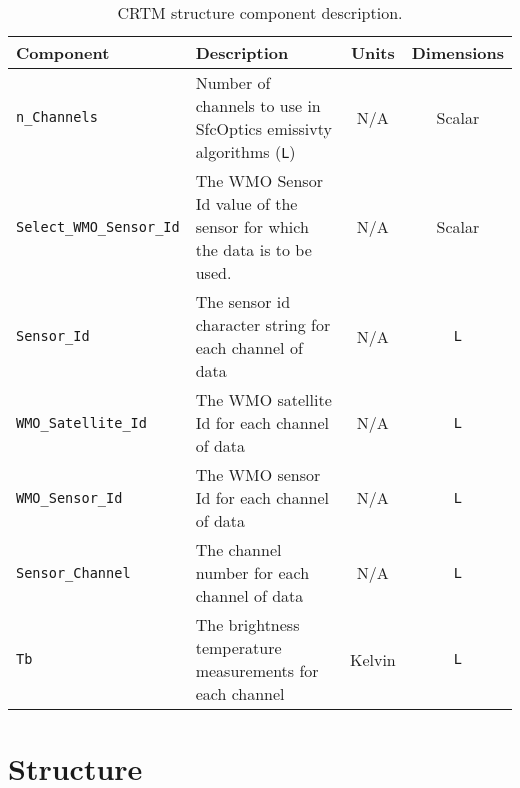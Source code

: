 \begin{table}[htp]
  \centering
  \begin{tabular}{l p{7cm} c c}
    \hline
    \sffamily\textbf{Component} & \sffamily\textbf{Description} & \sffamily\textbf{Units} & \sffamily\textbf{Dimensions} \\
    \hline\hline
    \texttt{n\_Channels} & Number of channels to use in SfcOptics emissivty algorithms (\texttt{L}) & N/A & Scalar \\
    \texttt{Select\_WMO\_Sensor\_Id} & The WMO Sensor Id value of the sensor for which the data is to be used. & N/A & Scalar \\
    \texttt{Sensor\_Id} & The sensor id character string for each channel of data & N/A & \texttt{L} \\
    \texttt{WMO\_Satellite\_Id} & The WMO satellite Id for each channel of data & N/A & \texttt{L} \\
    \texttt{WMO\_Sensor\_Id} & The WMO sensor Id for each channel of data & N/A & \texttt{L} \\
    \texttt{Sensor\_Channel} & The channel number for each channel of data & N/A & \texttt{L} \\
    \texttt{Tb} & The brightness temperature measurements for each channel & Kelvin & \texttt{L} \\
    \hline
  \end{tabular}
  \caption{CRTM \SensorData{} structure component description.}
  \label{tab:sensordata_structure}
\end{table}

\clearpage








\clearpage
\section{\GeometryInfo{} Structure}
\label{sec:geometryinfo_structure}



